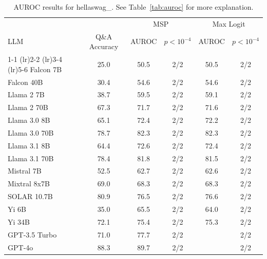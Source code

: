 \begin{table}[h]
\caption{AUROC results for hellaswag_. See Table~\ref{tab:auroc} for more explanation.}
\label{tab:auroc_margin}
\centering
\begin{tabular}{lccccc}
\toprule
& & \multicolumn{2}{c}{MSP} & \multicolumn{2}{c}{Max Logit} \\ 
LLM & Q\&A Accuracy & AUROC & $p < 10^{-4}$ & AUROC & $p < 10^{-4}$ \\ 
\cmidrule(lr){1-1} \cmidrule(lr){2-2} \cmidrule(lr){3-4} \cmidrule(lr){5-6} 
Falcon 7B & 25.0 & 50.5 & 2/2 & 50.5 & 2/2\\
Falcon 40B & 30.4 & 54.6 & 2/2 & 54.6 & 2/2\\
Llama 2 7B & 38.7 & 59.5 & 2/2 & 59.1 & 2/2\\
Llama 2 70B & 67.3 & 71.7 & 2/2 & 71.6 & 2/2\\
Llama 3.0 8B & 65.1 & 72.4 & 2/2 & 72.2 & 2/2\\
Llama 3.0 70B & 78.7 & 82.3 & 2/2 & 82.3 & 2/2\\
Llama 3.1 8B & 64.4 & 72.6 & 2/2 & 72.4 & 2/2\\
Llama 3.1 70B & 78.4 & 81.8 & 2/2 & 81.5 & 2/2\\
Mistral 7B & 52.5 & 62.7 & 2/2 & 62.6 & 2/2\\
Mixtral 8x7B & 69.0 & 68.3 & 2/2 & 68.3 & 2/2\\
SOLAR 10.7B & 80.9 & 76.5 & 2/2 & 76.6 & 2/2\\
Yi 6B & 35.0 & 65.5 & 2/2 & 64.0 & 2/2\\
Yi 34B & 72.1 & 75.4 & 2/2 & 75.3 & 2/2\\
GPT-3.5 Turbo & 71.0 & 77.7 & 2/2 &  & 2/2\\
GPT-4o & 88.3 & 89.7 & 2/2 &  & 2/2\\
\bottomrule
\end{tabular}
\end{table}
